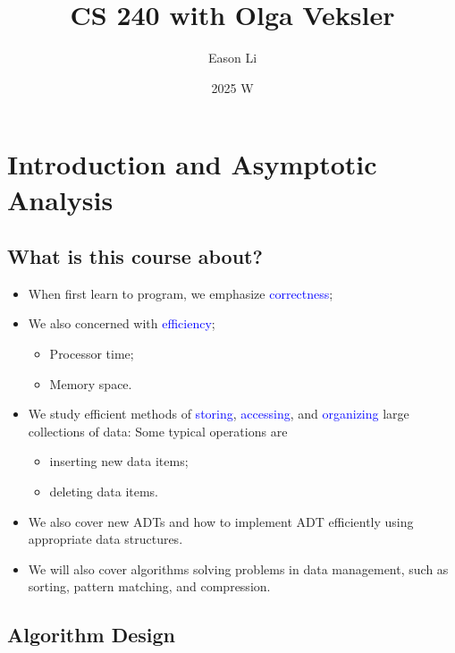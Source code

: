 \documentclass{article}
\begin{document}
\title{CS 240 with Olga Veksler}
\author{Eason Li}
\date{2025 W}
\maketitle


\tableofcontents


\newpage


\begin{center}
\end{center}

\section{Introduction and Asymptotic Analysis} 

\subsection{What is this course about?} 

\begin{itemize}
    \item When first learn to program, we emphasize \textcolor{blue}{correctness}; 
    \item We also concerned with \textcolor{blue}{efficiency}; \begin{itemize}
        \item Processor time; 
        \item Memory space. 
    \end{itemize}
    \item We study efficient methods of \textcolor{blue}{storing}, \textcolor{blue}{accessing}, and \textcolor{blue}{organizing} large collections of data: Some typical operations are \begin{itemize}
        \item inserting new data items; 
        \item deleting data items.
    \end{itemize}
    \item We also cover new ADTs and how to implement ADT efficiently using appropriate data structures. 
    \item We will also cover algorithms solving problems in data management, such as sorting, pattern matching, and compression. 
\end{itemize}

\subsection{Algorithm Design}
\end{document}
